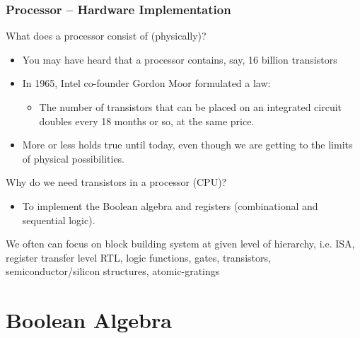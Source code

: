 \documentclass{beamer}
\begin{document}
\begin{frame}
\frametitle{Processor -- Hardware Implementation}

What does a processor consist of (physically)?

\begin{itemize}
\item You may have heard that a processor contains, say, 16 billion transistors
\item In 1965, Intel co-founder Gordon Moor formulated a law:
\begin{itemize}
\item The number of transistors that can be placed on an integrated circuit doubles every 18 months or so, at the same price.
\end{itemize}
\item More or less holds true until today, even though we are getting to the limits of physical possibilities.
\end{itemize}

Why do we need transistors in a processor (CPU)?
\begin{itemize}
\item To implement the Boolean algebra and registers (combinational and sequential logic).
\end{itemize}
We often can focus on block building system at given level of hierarchy, i.e. ISA, register transfer level RTL, logic functions, gates, transistors, semiconductor/silicon structures, atomic-gratings
\end{frame}



\section{Boolean Algebra}
\end{document}
